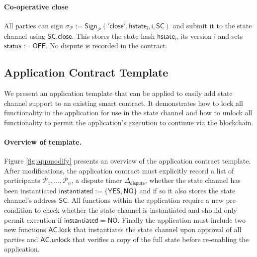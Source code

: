 \documentclass{llncs}
\newcommand{\instantiated}{\mathsf{instantiated}}
\newcommand{\instantiatedno}{\mathsf{NO}}
\newcommand{\instantiatedyes}{\mathsf{YES}}
\newcommand{\chanstatus}{\mathsf{status}}
\newcommand{\chanoff}{\mathsf{OFF}}
\newcommand{\hstatei}{\mathsf{hstate}_{\monotoniccounter}}
\newcommand{\monotoniccounter}{\mathsf{i}}
\newcommand{\participant}{\mathcal{P}}
\newcommand{\statechannel}{\mathsf{SC}}
\newcommand{\statechannelclose}{\mathsf{SC}.\mathsf{close}}
\newcommand{\sign}{\mathsf{Sign}}
\newcommand{\applock}{\mathsf{AC.lock}}
\newcommand{\appunlock}{\mathsf{AC.unlock}}
\newcommand{\timerdispute}{\mathsf{\Delta}_{\mathsf{dispute}}}
\begin{document}
\paragraph{Co-operative close}
All parties can sign 
$\sigma_{\participant} := \sign_{\participant}(\mathsf{'close'},\hstatei, \monotoniccounter, \statechannel)$ and submit it to the state channel using $\statechannelclose$.
This stores the state hash $\hstatei$, its version $\monotoniccounter$ and sets $\chanstatus := \chanoff$. 
No dispute is recorded in the contract. 

\subsection{Application Contract Template}

We present an application template that can be applied to easily add state channel support to an existing smart contract. 
It demonstrates how to lock all functionality in the application for use in the state channel and how to unlock all functionality to permit the application's execution to continue via the blockchain. 


\paragraph{Overview of template. } \label{sec:template} 
Figure \ref{fig:appmodify} presents an overview of the application contract template.
After modifications, the application contract must explicitly record a list of participants $\participant_{1},...,\participant_{n}$, a dispute timer $\timerdispute$, whether the state channel has been instantiated  $\instantiated := \{\instantiatedyes, \instantiatedno\}$ and if so it also stores the state channel's address  $\statechannel$. 
All functions within the application require a new pre-condition to check whether the state channel is instantiated and should only permit execution if $\instantiated = \instantiatedno$. 
Finally the application must include two new functions $\applock$ that instantiates the state channel upon approval of all parties and $\appunlock$ that verifies a copy of the full state before re-enabling the application. 


\end{document}
